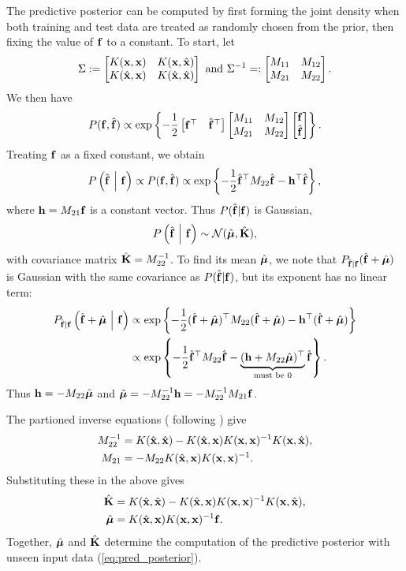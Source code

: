 The predictive posterior can be computed by first forming the joint density when both training and test data are treated as randomly chosen from the prior, then fixing the value of $\mathbf{f}$ to a constant.  To start, let
\[
  \Sigma := \begin{bmatrix} 
    K(\mathbf{x}, \mathbf{x})     & K(\mathbf{x}, \hat{\mathbf{x}})     \\
    K(\hat{\mathbf{x}}, \mathbf{x}) & K(\hat{\mathbf{x}}, \hat{\mathbf{x}})
   \end{bmatrix}
  \text{ and }
  \Sigma^{-1} =: \begin{bmatrix} 
    M_{11} & M_{12} \\
    M_{21} & M_{22}
   \end{bmatrix}.
\]
We then have
\[
  P(\mathbf{f}, \hat{\mathbf{f}})
  \propto
  \exp\left\{ 
    -\frac12
    \begin{bmatrix} \mathbf{f}^\top & \hat{\mathbf{f}}^\top \end{bmatrix}
    \begin{bmatrix} M_{11} & M_{12} \\ M_{21} & M_{22} \end{bmatrix}
    \begin{bmatrix} \mathbf{f} \\ \hat{\mathbf{f}} \end{bmatrix}
   \right\}.
\]
Treating $\mathbf{f}$ as a fixed constant, we obtain
\[
  P\left( \hat{\mathbf{f}} \ \middle\vert\  \mathbf{f} \right)
  \propto
  P(\mathbf{f}, \hat{\mathbf{f}})
  \propto
  \exp\left\{ 
    -\frac12 \hat{\mathbf{f}}^\top M_{22} \hat{\mathbf{f}}
    - \mathbf{h}^\top \hat{\mathbf{f}}
   \right\},
\]
where $\mathbf{h} = M_{21} \mathbf{f}$ is a constant vector.  Thus $P(\hat{\mathbf{f}} | \mathbf{f})$ is Gaussian,
\begin{equation}\label{eq:pred_posterior}
  P\left( \hat{\mathbf{f}} \ \middle\vert\  \mathbf{f} \right) \sim \mathcal{N}(\hat{\bm{\mu}}, \hat{\mathbf{K}}),
\end{equation}
with covariance matrix $\hat{\mathbf{K}} = M_{22}^{-1}$.  To find its mean $\hat{\bm{\mu}}$, we note that $P_{\hat{\mathbf{f}}|\mathbf{f}}(\hat{\mathbf{f}} + \hat{\bm{\mu}})$ is Gaussian with the same covariance as $P(\hat{\mathbf{f}} | \mathbf{f})$, but its exponent has no linear term:
\begin{align*}
  P_{\hat{\mathbf{f}}|\mathbf{f}} \left( \hat{\mathbf{f}} + \hat{\bm{\mu}} \ \middle\vert\  \mathbf{f} \right)
  &\propto
  \exp\left\{ 
    -\frac12 (\hat{\mathbf{f}} + \hat{\bm{\mu}})^\top M_{22} (\hat{\mathbf{f}} + \hat{\bm{\mu}})
    - \mathbf{h}^\top (\hat{\mathbf{f}} + \hat{\bm{\mu}})
   \right\} \\
  &\propto
  \exp\left\{ 
    -\frac12 \hat{\mathbf{f}}^\top M_{22} \hat{\mathbf{f}}
    - \underbrace{(\mathbf{h} + M_{22} \hat{\bm{\mu}})^\top}_{\text{must be $0$}} \hat{\mathbf{f}}
   \right\}.
\end{align*}
Thus $\mathbf{h} = -M_{22} \hat{\bm{\mu}}$ and $\hat{\bm{\mu}} = -M_{22}^{-1} \mathbf{h} = -M_{22}^{-1} M_{21} \mathbf{f}$.

The partioned inverse equations (\citealp*{barnett1979matrix} following \citealp*{mackay1998introduction}) give
\begin{align*}
  M_{22}^{-1} &= K(\hat{\mathbf{x}},\hat{\mathbf{x}}) - K(\hat{\mathbf{x}},\mathbf{x}) K(\mathbf{x},\mathbf{x})^{-1} K(\mathbf{x},\hat{\mathbf{x}}), \\
  M_{21} &= -M_{22} K(\hat{\mathbf{x}},\mathbf{x}) K(\mathbf{x},\mathbf{x})^{-1}.
\end{align*}
Substituting these in the above gives
\begin{align}
  \hat{\mathbf{K}} &= K(\hat{\mathbf{x}},\hat{\mathbf{x}}) - K(\hat{\mathbf{x}},\mathbf{x}) K(\mathbf{x},\mathbf{x})^{-1} K(\mathbf{x},\hat{\mathbf{x}}),\label{eq:K_hat} \\
  \hat{\bm{\mu}} &= K(\hat{\mathbf{x}},\mathbf{x}) K(\mathbf{x},\mathbf{x})^{-1}\mathbf{f}.\label{eq:mu_hat}
\end{align}
Together, $\hat{\bm{\mu}}$ and $\hat{\mathbf{K}}$ determine the computation of the predictive posterior
with unseen input data (\ref{eq:pred_posterior}).

